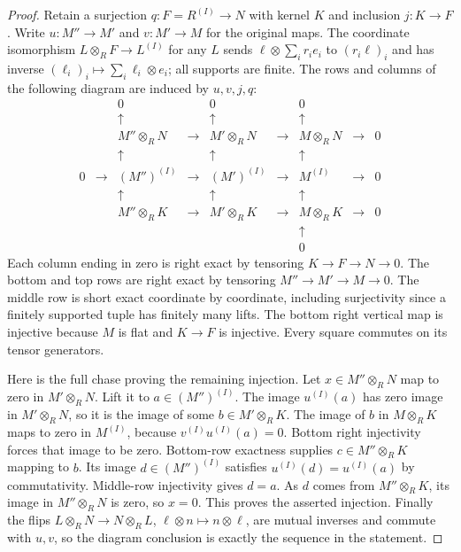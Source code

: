 \begin{proof}
Retain a surjection $q:F=R^{(I)}\to N$ with kernel
$K$ and inclusion $j:K\to F$. Write $u:M''\to M'$ and
$v:M'\to M$ for the original maps. The coordinate
isomorphism $L\otimes_R F\to L^{(I)}$ for any $L$ sends
$\ell\otimes\sum_i r_ie_i$ to $(r_i\ell)_i$ and has
inverse $(\ell_i)_i\mapsto\sum_i\ell_i\otimes e_i$;
all supports are finite. The rows and columns of the
following diagram are induced by $u,v,j,q$:
$$
\begin{matrix}
 & & 0 & & 0 & & 0 & & \\
 & & \uparrow & & \uparrow & & \uparrow & & \\
 & & M''\otimes_R N & \to & M' \otimes_R N & \to & M \otimes_R N & \to & 0 \\
 & & \uparrow & & \uparrow & & \uparrow & & \\
0 & \to & (M'')^{(I)} & \to & (M')^{(I)} & \to & M^{(I)} & \to & 0 \\
 & & \uparrow & & \uparrow & & \uparrow & & \\
 & & M''\otimes_R K & \to & M' \otimes_R K & \to & M \otimes_R K & \to & 0 \\
 & & & & & & \uparrow & & \\
 & & & & & & 0 & &
\end{matrix}
$$
Each column ending in zero is right exact by tensoring
$K\to F\to N\to0$. The bottom and top rows are right
exact by tensoring $M''\to M'\to M\to0$. The middle row
is short exact coordinate by coordinate, including
surjectivity since a finitely supported tuple has finitely
many lifts. The bottom right vertical map is injective
because $M$ is flat and $K\to F$ is injective.
Every square commutes on its tensor generators.

Here is the full chase proving the remaining injection.
Let $x\in M''\otimes_R N$ map to zero in $M'\otimes_R N$.
Lift it to $a\in(M'')^{(I)}$. The image $u^{(I)}(a)$
has zero image in $M'\otimes_R N$, so it is the image
of some $b\in M'\otimes_R K$. The image of $b$ in
$M\otimes_R K$ maps to zero in $M^{(I)}$, because
$v^{(I)}u^{(I)}(a)=0$. Bottom right injectivity forces
that image to be zero. Bottom-row exactness supplies
$c\in M''\otimes_R K$ mapping to $b$.
Its image $d\in(M'')^{(I)}$ satisfies
$u^{(I)}(d)=u^{(I)}(a)$ by commutativity. Middle-row
injectivity gives $d=a$. As $d$ comes from
$M''\otimes_R K$, its image in $M''\otimes_R N$ is zero,
so $x=0$. This proves the asserted injection.
Finally the flips $L\otimes_R N\to N\otimes_R L$,
$\ell\otimes n\mapsto n\otimes\ell$, are mutual inverses
and commute with $u,v$, so the diagram conclusion is
exactly the sequence in the statement.
\end{proof}

